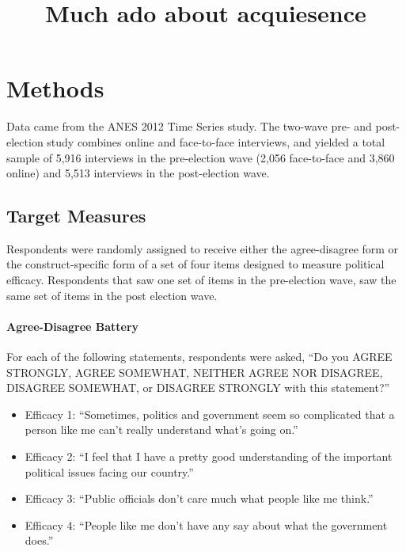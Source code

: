 \documentclass[man,apacite,floatsintext]{apa6}
\title{Much ado about acquiesence}
\begin{document}
\maketitle

\section{Methods}

Data came from the ANES 2012 Time Series study. The two-wave pre- and post-election study combines online and face-to-face interviews, and yielded a total sample of 5,916 interviews in the pre-election wave (2,056 face-to-face and 3,860 online) and 5,513 interviews in the post-election wave. 

\subsection{Target Measures} 
Respondents were randomly assigned to receive either the agree-disagree form or the construct-specific form of a set of four items designed to measure political efficacy. Respondents that saw one set of items in the pre-election wave, saw the same set of items in the post election wave. 
\paragraph{Agree-Disagree Battery}
For each of the following statements, respondents were asked, ``Do you AGREE STRONGLY, AGREE SOMEWHAT, NEITHER AGREE NOR DISAGREE, DISAGREE SOMEWHAT, or DISAGREE STRONGLY with this statement?''
\begin{itemize}
\item Efficacy 1:  ``Sometimes, politics and government seem so complicated that a person like me can't really understand what's going on.''
\item Efficacy 2:  ``I feel that I have a pretty good understanding of the important political issues facing our country.''
\item Efficacy 3: ``Public officials don't care much what people like me think.''
\item Efficacy 4: ``People like me don't have any say about what the government does.''
\end{itemize}
\end{document}
